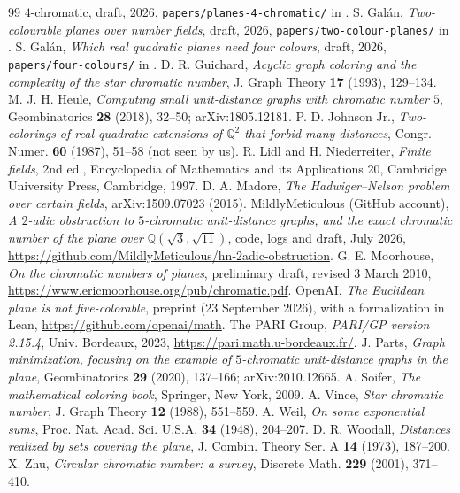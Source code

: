 \documentclass[11pt,a4paper]{amsart}
\theoremstyle{remark}
\newcommand{\Q}{\mathbb{Q}}
\begin{document}
\begin{thebibliography}{99}
{$4$-chromatic},
draft, 2026, \texttt{papers/planes-4-chromatic/} in \cite{Repo}.
 S. Gal\'an, \emph{Two-colourable planes over number fields}, draft, 2026,
\texttt{papers/two-colour-planes/} in \cite{Repo}.
 S. Gal\'an, \emph{Which real quadratic planes need four colours}, draft, 2026,
\texttt{papers/four-colours/} in \cite{Repo}.
 D. R. Guichard, \emph{Acyclic graph coloring and the complexity of the star chromatic number},
J. Graph Theory \textbf{17} (1993), 129--134.
 M. J. H. Heule, \emph{Computing small unit-distance graphs with chromatic number $5$},
Geombinatorics \textbf{28} (2018), 32--50; arXiv:1805.12181.
 P. D. Johnson Jr., \emph{Two-colorings of real quadratic extensions of $\Q^2$ that forbid
many distances}, Congr. Numer. \textbf{60} (1987), 51--58 (not seen by us).
 R. Lidl and H. Niederreiter, \emph{Finite fields}, 2nd ed., Encyclopedia of Mathematics and its
Applications 20, Cambridge University Press, Cambridge, 1997.
 D. A. Madore, \emph{The Hadwiger--Nelson problem over certain fields}, arXiv:1509.07023 (2015).
 MildlyMeticulous (GitHub account), \emph{A $2$-adic obstruction to $5$-chromatic unit-distance
graphs, and the exact chromatic number of the plane over $\Q(\sqrt3,\sqrt{11})$}, code, logs and draft, July 2026,
\url{https://github.com/MildlyMeticulous/hn-2adic-obstruction}.
 G. E. Moorhouse, \emph{On the chromatic numbers of planes}, preliminary draft, revised
3 March 2010, \url{https://www.ericmoorhouse.org/pub/chromatic.pdf}.
 OpenAI, \emph{The Euclidean plane is not five-colorable}, preprint (23 September 2026), with a
formalization in Lean, \url{https://github.com/openai/math}.
 The PARI Group, \emph{PARI/GP version 2.15.4}, Univ. Bordeaux, 2023, \url{https://pari.math.u-bordeaux.fr/}.
 J. Parts, \emph{Graph minimization, focusing on the example of $5$-chromatic unit-distance graphs in
the plane}, Geombinatorics \textbf{29} (2020), 137--166; arXiv:2010.12665.
 A. Soifer, \emph{The mathematical coloring book}, Springer, New York, 2009.
 A. Vince, \emph{Star chromatic number}, J. Graph Theory \textbf{12} (1988), 551--559.
 A. Weil, \emph{On some exponential sums}, Proc. Nat. Acad. Sci. U.S.A. \textbf{34} (1948), 204--207.
 D. R. Woodall, \emph{Distances realized by sets covering the plane}, J. Combin. Theory Ser. A
\textbf{14} (1973), 187--200.
 X. Zhu, \emph{Circular chromatic number: a survey}, Discrete Math. \textbf{229} (2001), 371--410.
\end{thebibliography}
\end{document}
